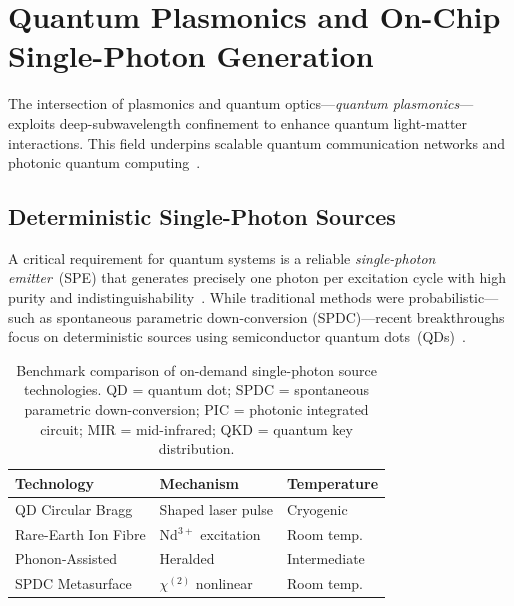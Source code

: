 \documentclass[twocolumn,10pt]{article}
\begin{document}
\section{Quantum Plasmonics and On-Chip Single-Photon Generation}
\label{sec:quantum}

The intersection of plasmonics and quantum optics---\textit{quantum
plasmonics}---exploits deep-subwavelength confinement to enhance quantum
light-matter interactions.  This field underpins scalable quantum
communication networks and photonic quantum
computing~\cite{lodahl2015interfacing,senellart2017high}.

\subsection{Deterministic Single-Photon Sources}

A critical requirement for quantum systems is a reliable
\textit{single-photon emitter}~(SPE) that generates precisely one photon
per excitation cycle with high purity and
indistinguishability~\cite{senellart2017high}.  While traditional methods
were probabilistic---such as spontaneous parametric down-conversion
(SPDC)---recent breakthroughs focus on deterministic sources using
semiconductor quantum dots~(QDs)~\cite{lodahl2015interfacing,senellart2017high}.

\begin{table}[H]
\small
\centering
\caption{Benchmark comparison of on-demand single-photon source
technologies.  QD = quantum dot; SPDC = spontaneous parametric
down-conversion; PIC = photonic integrated circuit; MIR = mid-infrared;
QKD = quantum key distribution.}
\label{tab:sps}
\begin{tabularx}{\columnwidth}{@{}lXX@{}}
\toprule
\textbf{Technology} & \textbf{Mechanism} & \textbf{Temperature} \\
\midrule
QD Circular Bragg & Shaped laser pulse & Cryogenic \\
Rare-Earth Ion Fibre & Nd$^{3+}$ excitation & Room temp. \\
Phonon-Assisted & Heralded & Intermediate \\
SPDC Metasurface & $\chi^{(2)}$ nonlinear & Room temp. \\
\bottomrule
\end{tabularx}
\end{table}
\end{document}

